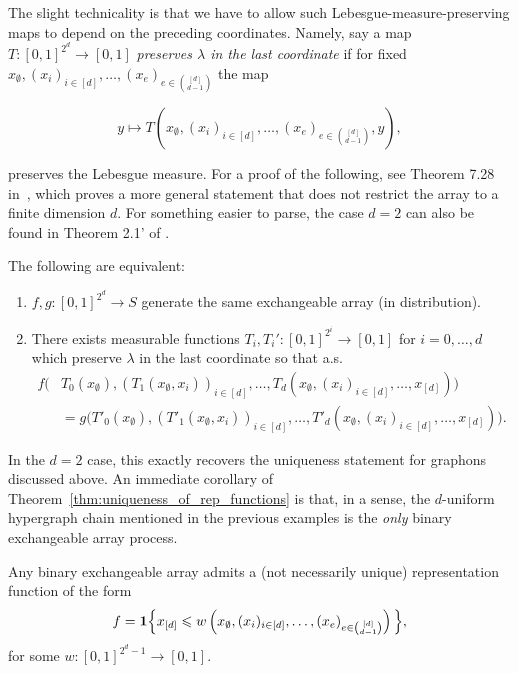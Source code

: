 The slight technicality is that we have to allow such Lebesgue-measure-preserving maps
to depend on the preceding coordinates. Namely, say a
map $T:[0,1]^{2^d} \to [0,1]$ \textit{preserves $\lambda$ in the last coordinate}
if for fixed $x_\emptyset, (x_i)_{i \in [d]}, \ldots, (x_e)_{e \in \binom{[d]}{d-1}}$ the map

\[y \mapsto T(x_\emptyset, (x_i)_{i \in [d]}, \ldots, (x_e)_{e \in \binom{[d]}{d-1}}, y),\]

\noindent preserves the Lebesgue measure. For a proof of the following, see
Theorem 7.28 in~\cite{kallenberg2005_probabilistic_symmetries}, which proves
 a more general statement that does not restrict the array to a finite dimension $d$.
 For something easier to parse, the case $d=2$ can also be found in
 Theorem 2.1' of \cite{kallenberg1989_representation_exchangeable_arrays}.
%
\begin{theorem}
\label{thm:uniqueness_of_rep_functions}
    The following are equivalent:
    \begin{enumerate}
        \item $f,g:[0,1]^{2^d} \to S$ generate the same exchangeable array (in distribution).

        \item There exists measurable functions $T_i,T_i' : [0,1]^{2^i} \to [0,1]$  for  $i = 0,\ldots, d$ which preserve $\lambda$ in the last coordinate so that a.s.
        \begin{align*}
          f\Big( & T_0(x_\emptyset), (T_1(x_\emptyset, x_i))_{i \in [d]}, \dots, T_d(x_\emptyset, (x_i)_{i \in [d]}, \dots, x_{[d]}) \Big)  \\
          & = g\Big(  T'_0(x_\emptyset), (T'_1(x_\emptyset, x_i))_{i \in [d]}, \dots,  T'_d(x_\emptyset, (x_i)_{i \in [d]}, \dots, x_{[d]}) \Big).
        \end{align*}
    \end{enumerate}
\end{theorem}
%
In the $d=2$ case, this exactly recovers the uniqueness statement for graphons discussed above.
An immediate corollary of Theorem~\ref{thm:uniqueness_of_rep_functions} is that, in a sense, the $d$-uniform hypergraph chain mentioned in the previous examples is the \textit{only} binary exchangeable array process.

\begin{corollary}
\label{cor:classification_binary_array_processes}
    Any binary exchangeable array admits a (not necessarily unique) representation function of the form
    \[f = \mathbf{1} \Big\{x_{[d]} \leqslant w\left(x_\emptyset, (x_i)_{i \in [d]}, \ldots, (x_e)_{e \in \binom{[d]}{d-1}} \right)\Big\},\]
    \noindent for some $w:[0,1]^{2^d - 1} \to [0,1]$.
\end{corollary}

